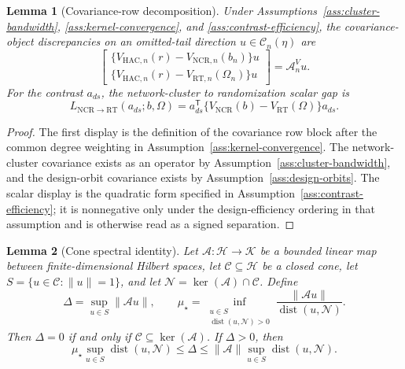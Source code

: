 \documentclass[11pt]{article}
\newcommand{\transpose}{\mathsf{T}}
\theoremstyle{definition}
\theoremstyle{plain}
\newtheorem{lemma}{Lemma}
\theoremstyle{remark}
\begin{document}
\begin{lemma}[Covariance-row decomposition]\label{lem:cov-decomposition}
Under Assumptions~\ref{ass:cluster-bandwidth}, \ref{ass:kernel-convergence},
and \ref{ass:contrast-efficiency}, the covariance-object discrepancies on an
omitted-tail direction \(u\in\mathcal C_n(\eta)\) are
\[
  \begin{bmatrix}
  \{V_{\mathrm{HAC},n}(r)-V_{\mathrm{NCR},n}(b_n)\}u\\
  \{V_{\mathrm{HAC},n}(r)-V_{\mathrm{RT},n}(\Omega_n)\}u
  \end{bmatrix}
  =
  \mathcal A^V_nu.
\]
For the contrast \(a_{ds}\), the network-cluster to randomization scalar gap is
\[
  L_{\mathrm{NCR}\to\mathrm{RT}}(a_{ds};b,\Omega)
  =
  a_{ds}^{\transpose}\{V_{\mathrm{NCR}}(b)-V_{\mathrm{RT}}(\Omega)\}a_{ds}.
\]
\end{lemma}

\begin{proof}
The first display is the definition of the covariance row block after the
common degree weighting in Assumption~\ref{ass:kernel-convergence}.  The
network-cluster covariance exists as an operator by
Assumption~\ref{ass:cluster-bandwidth}, and the design-orbit covariance exists
by Assumption~\ref{ass:design-orbits}.  The scalar display is the quadratic
form specified in Assumption~\ref{ass:contrast-efficiency}; it is nonnegative
only under the design-efficiency ordering in that assumption and is otherwise
read as a signed separation.
\end{proof}

\begin{lemma}[Cone spectral identity]\label{lem:spectral}
Let \(\mathcal A:\mathcal H\to\mathcal K\) be a bounded linear map between
finite-dimensional Hilbert spaces, let \(\mathcal C\subseteq\mathcal H\) be a
closed cone, let \(S=\{u\in\mathcal C:\|u\|=1\}\), and let
\(\mathcal N=\ker(\mathcal A)\cap\mathcal C\).  Define
\[
  \Delta=\sup_{u\in S}\|\mathcal A u\|,
  \qquad
  \mu_\star=
  \inf_{\substack{u\in S\\ \operatorname{dist}(u,\mathcal N)>0}}
  \frac{\|\mathcal A u\|}{\operatorname{dist}(u,\mathcal N)}.
\]
Then \(\Delta=0\) if and only if \(\mathcal C\subseteq\ker(\mathcal A)\).
If \(\Delta>0\), then
\[
  \mu_\star \sup_{u\in S}\operatorname{dist}(u,\mathcal N)
  \le
  \Delta
  \le
  \|\mathcal A\|\sup_{u\in S}\operatorname{dist}(u,\mathcal N).
\]
\end{lemma}
\end{document}
